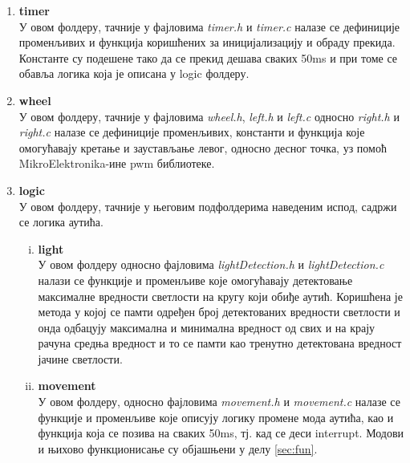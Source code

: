 \begin{enumerate}[1.]
	\item \textbf{timer}\\
	У овом фолдеру, тачније у фајловима \textit{timer.h} и \textit{timer.c} налазе се дефиниције променљивих и функција коришћених за иницијализацију и обраду прекида. Константе су подешене тако да се прекид дешава сваких 50ms и при томе се обавља логика која је описана у logic фолдеру.
	\item \textbf{wheel}\\
	У овом фолдеру, тачније у фајловима \textit{wheel.h}, \textit{left.h} и \textit{left.c} односно \textit{right.h} и \textit{right.c} налазе се дефиниције променљивих, константи и функција које омогућавају кретање и заустављање левог, односно десног точка, уз помоћ MikroElektronika-ине pwm библиотеке. 
	\item \textbf{logic}\\
		У овом фолдеру, тачније у његовим подфолдерима наведеним испод, садржи се логика аутића.
		\begin{enumerate}[i)]
			\item \textbf{light}\\
				У овом фолдеру односно фајловима \textit{lightDetection.h} и \textit{lightDetection.c} налази се функције и променљиве које омогућавају детектовање максималне вредности светлости на кругу који обиђе аутић. Коришћена је метода у којој се памти одређен број детектованих вредности светлости и онда одбацују максимална и минимална вредност од свих и на крају рачуна средња вредност и то се памти као тренутно детектована вредност јачине светлости. 
			\item \textbf{movement}\\
				У овом фолдеру, односно фајловима \textit{movement.h} и \textit{movement.c} налазе се функције и променљиве које описују логику промене мода аутића, као и функција која се позива на сваких 50ms, тј. кад се деси interrupt. Модови и њихово функционисање су објашњени у делу \ref{sec:fun}.
		\end{enumerate}


\end{enumerate}


